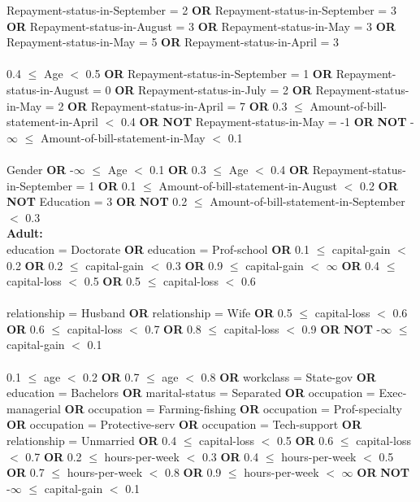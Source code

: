 \noindent Repayment-status-in-September = 2 \textbf{OR} Repayment-status-in-September = 3 \textbf{OR} Repayment-status-in-August = 3 \textbf{OR} Repayment-status-in-May = 3 \textbf{OR} Repayment-status-in-May = 5 \textbf{OR} Repayment-status-in-April = 3 \\\\0.4 $\le$ Age $<$ 0.5 \textbf{OR} Repayment-status-in-September = 1 \textbf{OR} Repayment-status-in-August = 0 \textbf{OR} Repayment-status-in-July = 2 \textbf{OR} Repayment-status-in-May = 2 \textbf{OR} Repayment-status-in-April = 7 \textbf{OR} 0.3 $\le$ Amount-of-bill-statement-in-April $<$ 0.4 \textbf{OR}  \textbf{NOT} Repayment-status-in-May = -1 \textbf{OR}  \textbf{NOT} -$\infty$ $\le$ Amount-of-bill-statement-in-May $<$ 0.1 \\\\Gender \textbf{OR} -$\infty$ $\le$ Age $<$ 0.1 \textbf{OR} 0.3 $\le$ Age $<$ 0.4 \textbf{OR} Repayment-status-in-September = 1 \textbf{OR} 0.1 $\le$ Amount-of-bill-statement-in-August $<$ 0.2 \textbf{OR}  \textbf{NOT} Education = 3 \textbf{OR}  \textbf{NOT} 0.2 $\le$ Amount-of-bill-statement-in-September $<$ 0.3 \\

\noindent \textbf{ Adult: }\\

\noindent education =  Doctorate \textbf{OR} education =  Prof-school \textbf{OR} 0.1 $\le$ capital-gain $<$ 0.2 \textbf{OR} 0.2 $\le$ capital-gain $<$ 0.3 \textbf{OR} 0.9 $\le$ capital-gain $<$ $\infty$ \textbf{OR} 0.4 $\le$ capital-loss $<$ 0.5 \textbf{OR} 0.5 $\le$ capital-loss $<$ 0.6 \\\\relationship =  Husband \textbf{OR} relationship =  Wife \textbf{OR} 0.5 $\le$ capital-loss $<$ 0.6 \textbf{OR} 0.6 $\le$ capital-loss $<$ 0.7 \textbf{OR} 0.8 $\le$ capital-loss $<$ 0.9 \textbf{OR}  \textbf{NOT} -$\infty$ $\le$ capital-gain $<$ 0.1 \\\\0.1 $\le$ age $<$ 0.2 \textbf{OR} 0.7 $\le$ age $<$ 0.8 \textbf{OR} workclass =  State-gov \textbf{OR} education =  Bachelors \textbf{OR} marital-status =  Separated \textbf{OR} occupation =  Exec-managerial \textbf{OR} occupation =  Farming-fishing \textbf{OR} occupation =  Prof-specialty \textbf{OR} occupation =  Protective-serv \textbf{OR} occupation =  Tech-support \textbf{OR} relationship =  Unmarried \textbf{OR} 0.4 $\le$ capital-loss $<$ 0.5 \textbf{OR} 0.6 $\le$ capital-loss $<$ 0.7 \textbf{OR} 0.2 $\le$ hours-per-week $<$ 0.3 \textbf{OR} 0.4 $\le$ hours-per-week $<$ 0.5 \textbf{OR} 0.7 $\le$ hours-per-week $<$ 0.8 \textbf{OR} 0.9 $\le$ hours-per-week $<$ $\infty$ \textbf{OR}  \textbf{NOT} -$\infty$ $\le$ capital-gain $<$ 0.1 \\

